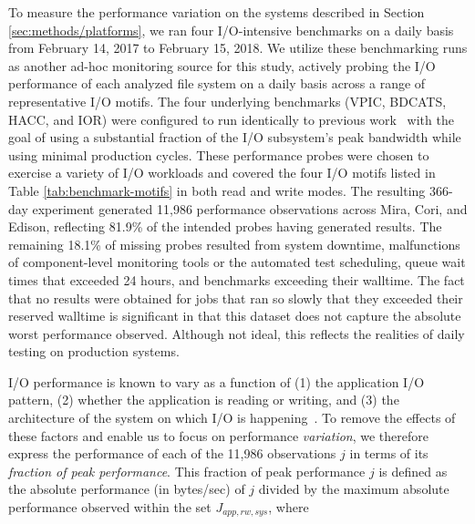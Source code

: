To measure the performance variation on the systems described in Section \ref{sec:methods/platforms}, we ran four I/O-intensive benchmarks on a daily basis from February 14, 2017 to February 15, 2018.
We utilize these benchmarking runs as another ad-hoc monitoring source for this study, actively probing the I/O performance of each analyzed file system on a daily basis across a range of representative I/O motifs.
The four underlying benchmarks (VPIC, BDCATS, HACC, and IOR) were configured to run identically to previous work~\cite{Lockwood2017} with the goal of using a substantial fraction of the I/O subsystem's peak bandwidth while using minimal production cycles.
These performance probes were chosen to exercise a variety of I/O workloads and covered the four I/O motifs listed in Table \ref{tab:benchmark-motifs} in both read and write modes.
The resulting 366-day experiment generated 11,986 performance observations across Mira, Cori, and Edison, reflecting 81.9\% of the intended probes having generated results.
The remaining 18.1\% of missing probes resulted from system downtime, malfunctions of component-level monitoring tools or the automated test scheduling, queue wait times that exceeded 24 hours, and benchmarks exceeding their walltime.
The fact that no results were obtained for jobs that ran so slowly that they exceeded their reserved walltime is significant in that this dataset does not capture the absolute worst performance observed.
Although not ideal, this reflects the realities of daily testing on production systems.


I/O performance is known to vary as a function of (1) the application I/O pattern, (2) whether the application is reading or writing, and (3) the architecture of the system on which I/O is happening~\cite{Lockwood2017}.
To remove the effects of these factors and enable us to focus on performance \emph{variation}, we therefore express the performance of each of the 11,986 observations $j$ in terms of its \emph{fraction of peak performance}.
This fraction of peak performance $j$ is defined as the absolute performance (in bytes/sec) of $j$ divided by the maximum absolute performance observed within the set $J_{app, rw, sys}$, where

